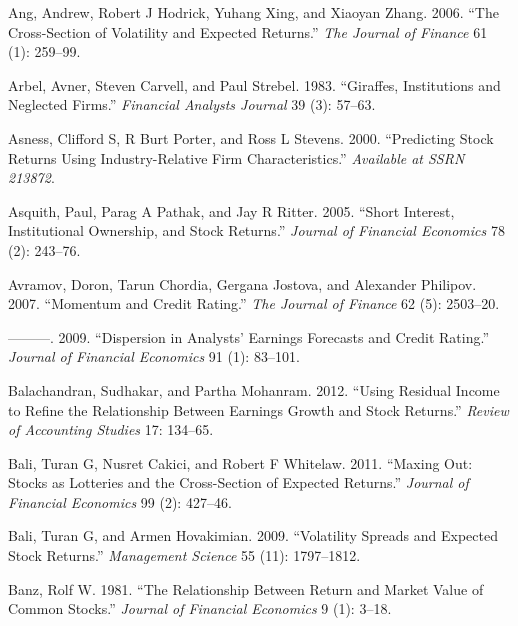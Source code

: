 \documentclass[
  letterpaper,
  DIV=11,
  numbers=noendperiod]{scrreprt}
\newlength{\cslhangindent}
\newlength{\cslentryspacingunit} %
\newenvironment{CSLReferences}[2] %
 {%
  \setlength{\parindent}{0pt}
  \ifodd #1
  \let\oldpar\par
  \def\par{\hangindent=\cslhangindent\oldpar}
  \fi
  \setlength{\parskip}{#2\cslentryspacingunit}
 }%
 {}
\begin{document}
\begin{CSLReferences}{1}{0}
\leavevmode{}%
Ang, Andrew, Robert J Hodrick, Yuhang Xing, and Xiaoyan Zhang. 2006.
{``The Cross-Section of Volatility and Expected Returns.''} \emph{The
Journal of Finance} 61 (1): 259--99.

\leavevmode{}%
Arbel, Avner, Steven Carvell, and Paul Strebel. 1983. {``Giraffes,
Institutions and Neglected Firms.''} \emph{Financial Analysts Journal}
39 (3): 57--63.

\leavevmode{}%
Asness, Clifford S, R Burt Porter, and Ross L Stevens. 2000.
{``Predicting Stock Returns Using Industry-Relative Firm
Characteristics.''} \emph{Available at SSRN 213872}.

\leavevmode{}%
Asquith, Paul, Parag A Pathak, and Jay R Ritter. 2005. {``Short
Interest, Institutional Ownership, and Stock Returns.''} \emph{Journal
of Financial Economics} 78 (2): 243--76.

\leavevmode{}%
Avramov, Doron, Tarun Chordia, Gergana Jostova, and Alexander Philipov.
2007. {``Momentum and Credit Rating.''} \emph{The Journal of Finance} 62
(5): 2503--20.

\leavevmode{}%
---------. 2009. {``Dispersion in Analysts' Earnings Forecasts and
Credit Rating.''} \emph{Journal of Financial Economics} 91 (1): 83--101.

\leavevmode{}%
Balachandran, Sudhakar, and Partha Mohanram. 2012. {``Using Residual
Income to Refine the Relationship Between Earnings Growth and Stock
Returns.''} \emph{Review of Accounting Studies} 17: 134--65.

\leavevmode{}%
Bali, Turan G, Nusret Cakici, and Robert F Whitelaw. 2011. {``Maxing
Out: Stocks as Lotteries and the Cross-Section of Expected Returns.''}
\emph{Journal of Financial Economics} 99 (2): 427--46.

\leavevmode{}%
Bali, Turan G, and Armen Hovakimian. 2009. {``Volatility Spreads and
Expected Stock Returns.''} \emph{Management Science} 55 (11):
1797--1812.

\leavevmode{}%
Banz, Rolf W. 1981. {``The Relationship Between Return and Market Value
of Common Stocks.''} \emph{Journal of Financial Economics} 9 (1): 3--18.


\end{CSLReferences}
\end{document}
